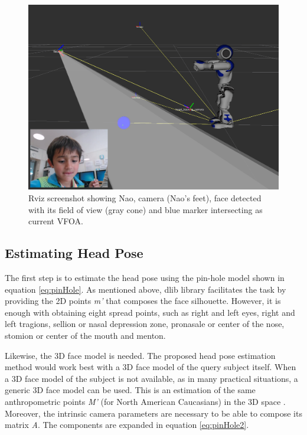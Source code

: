 \documentclass{sig-alternate}
\begin{document}
\begin{figure}
    \centering
    \includegraphics[width=0.9\columnwidth]{rviz_camera}
    \caption{\small Rviz screenshot showing Nao, camera (Nao's feet), face detected with its field of view (gray cone) and blue marker intersecting as current VFOA.}
    \label{rviz}
\end{figure}

\subsection{Estimating Head Pose}
The first step is to estimate the head pose using the pin-hole model shown in equation \ref{eq:pinHole}. As mentioned above, dlib library facilitates the task by providing the 2D points \textit{m'} that composes the face silhouette. However, it is enough with obtaining eight spread points, such as right and left eyes, right and left tragions, sellion or nasal depression zone, pronasale or center of the nose, stomion or center of the mouth and menton.

Likewise, the 3D face model is needed. The proposed head pose estimation method would work best with a 3D face model of the query subject itself. When a 3D face model of the subject is not available, as in many practical situations, a generic 3D face model can be used. This is an estimation of the same anthropometric points \textit{M'} (for North American Caucasians) in the 3D space \cite{farkas1994anthropometry}. Moreover, the intrinsic camera parameters are necessary to be able to compose its matrix \textit{A}. The components are expanded in equation \ref{eq:pinHole2}.	
\end{document}
